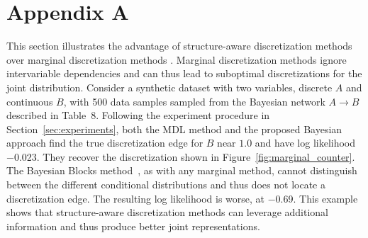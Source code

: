 \documentclass[twoside,11pt]{article}
\newcommand{\citep}[1]{\cite{#1}}
\begin{document}



\section*{Appendix A}
\label{sec:appendixA}


This section illustrates the advantage of structure-aware discretization methods over marginal discretization methods \citep{scott1979optimal,freedman1981histogram,knuth2013optimal,scargle2013studies}.
Marginal discretization methods ignore intervariable dependencies and can thus lead to suboptimal discretizations for the joint distribution.
Consider a synthetic dataset with two variables, discrete $A$ and continuous $B$, with \num{500} data samples sampled from the Bayesian network $A \rightarrow B$ described in Table~8.  %
Following the experiment procedure in Section~\ref{sec:experiments}, both the MDL method and the proposed Bayesian approach find the true discretization edge for $B$ near $1.0$ and have log likelihood \num{-0.023}.
They recover the discretization shown in Figure~\ref{fig:marginal_counter}.
The Bayesian Blocks method~\citep{scargle2013studies}, as with any marginal method, cannot distinguish between the different conditional distributions and thus does not locate a discretization edge.
The resulting log likelihood is worse, at \num{-0.69}.
This example shows that structure-aware discretization methods can leverage additional information and thus produce better joint representations.
\end{document}
